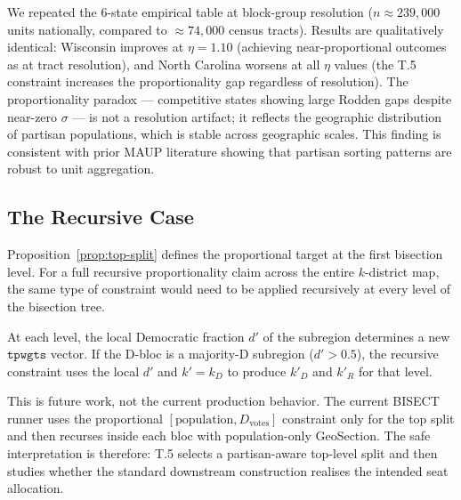 We repeated the 6-state empirical table at block-group resolution
($n \approx 239{,}000$ units nationally, compared to $\approx 74{,}000$ census
tracts).
Results are qualitatively identical: Wisconsin improves at $\eta = 1.10$
(achieving near-proportional outcomes as at tract resolution), and North Carolina
worsens at all $\eta$ values (the T.5 constraint increases the proportionality
gap regardless of resolution).
The proportionality paradox --- competitive states showing large Rodden gaps
despite near-zero $\sigma$ --- is not a resolution artifact; it reflects the
geographic distribution of partisan populations, which is stable across
geographic scales.
This finding is consistent with prior MAUP literature
\citep{chen2013} showing that partisan sorting patterns are robust to
unit aggregation.

\subsection{The Recursive Case}

Proposition~\ref{prop:top-split} defines the proportional target at the first
bisection level.
For a full recursive proportionality claim across the entire $k$-district map,
the same type of constraint would need to be applied recursively at every level
of the bisection tree.

At each level, the local Democratic fraction $d'$ of the subregion determines
a new $\mathtt{tpwgts}$ vector.
If the D-bloc is a majority-D subregion ($d' > 0.5$), the recursive constraint
uses the local $d'$ and $k' = k_D$ to produce $k'_D$ and $k'_R$ for that level.

This is future work, not the current production behavior. The current BISECT
runner uses the proportional $[\text{population}, D_{\text{votes}}]$ constraint
only for the top split and then recurses inside each bloc with population-only
GeoSection. The safe interpretation is therefore: T.5 selects a partisan-aware
top-level split and then studies whether the standard downstream construction
realises the intended seat allocation.
